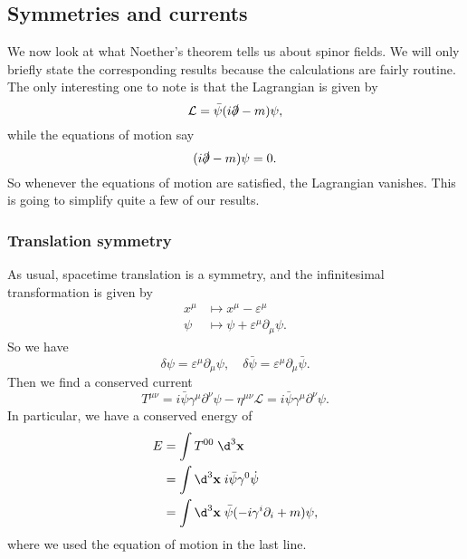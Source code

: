 \documentclass[a4paper]{article}
\begin{document}
\subsection{Symmetries and currents}
We now look at what Noether's theorem tells us about spinor fields. We will only briefly state the corresponding results because the calculations are fairly routine. The only interesting one to note is that the Lagrangian is given by
\[
  \mathcal{L} = \bar\psi (i \slashed\partial - m) \psi,
\]
while the equations of motion say
\[
  (i \slashed\partial - m)\psi = 0.
\]
So whenever the equations of motion are satisfied, the Lagrangian vanishes. This is going to simplify quite a few of our results.

\subsubsection*{Translation symmetry}
As usual, spacetime translation is a symmetry, and the infinitesimal transformation is given by
\begin{align*}
  x^\mu &\mapsto x^\mu - \varepsilon^\mu\\
  \psi &\mapsto \psi + \varepsilon^\mu \partial_\mu\psi.
\end{align*}
So we have
\[
  \delta \psi = \varepsilon^\mu \partial_\mu \psi,\quad \delta \bar\psi = \varepsilon^\mu \partial_\mu \bar\psi.
\]
Then we find a conserved current
\[
  T^{\mu\nu} = i \bar\psi \gamma^\mu \partial^\nu \psi - \eta^{\mu\nu}\mathcal{L} = i \bar\psi \gamma^\mu \partial^\nu \psi.
\]
In particular, we have a conserved energy of
\begin{align*}
  E &= \int T^{00}\;\d^3 \mathbf{x} \\
  &= \int \d^3 \mathbf{x}\; i \bar\psi \gamma^0 \dot\psi \\
  &= \int \d^3 \mathbf{x}\; \bar\psi(-i \gamma^i \partial_i + m)\psi,
\end{align*}
where we used the equation of motion in the last line.
\end{document}
